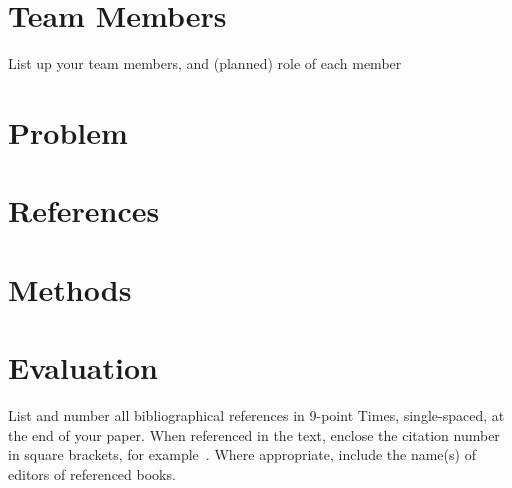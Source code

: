 \documentclass[10pt,twocolumn,letterpaper]{article}
\begin{document}
\section{Team Members}

List up your team members, and (planned) role of each member

\section{Problem}

\section{References}

\section{Methods}

\section{Evaluation}


List and number all bibliographical references in 9-point Times,
single-spaced, at the end of your paper. When referenced in the text,
enclose the citation number in square brackets, for
example~\cite{Authors14}.  Where appropriate, include the name(s) of
editors of referenced books.

{\small


}
\end{document}
